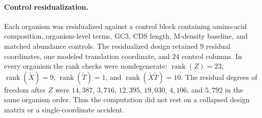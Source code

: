 \paragraph{Control residualization.}
Each organism was residualized against a control block containing amino-acid composition, organism-level terms, GC3, CDS length, M-density baseline, and matched abundance controls.  The residualized design retained $9$ residual coordinates, one modeled translation coordinate, and $24$ control columns.  In every organism the rank checks were nondegenerate: $\operatorname{rank}(Z)=23$, $\operatorname{rank}(\widetilde X)=9$, $\operatorname{rank}(\widetilde T)=1$, and $\operatorname{rank}(\widetilde X\widetilde T)=10$.  The residual degrees of freedom after $Z$ were $14{,}387$, $3{,}716$, $12{,}395$, $19{,}030$, $4{,}106$, and $5{,}792$ in the same organism order.  Thus the computation did not rest on a collapsed design matrix or a single-coordinate accident.

